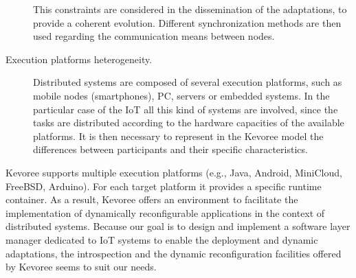 \begin{description}
	This constraints are considered in the dissemination of the adaptations, to provide a coherent evolution.
	Different synchronization methods are then used regarding the communication means between nodes.
	\item [Execution platforms heterogeneity.] Distributed systems are composed of several execution platforms, such as mobile nodes (smartphones), PC, servers or embedded systems. In the particular case of the IoT all this kind of systems are involved, since the tasks are distributed according to the hardware capacities of the available platforms.
	It is then necessary to represent in the Kevoree model the differences between participants and their specific characteristics.
\end{description}

Kevoree supports multiple execution platforms (e.g., Java, Android, MiniCloud, FreeBSD, Arduino).
For each target platform it provides a specific runtime container.
As a result, Kevoree offers an environment to facilitate the implementation of dynamically reconfigurable applications in the context of distributed systems. Because our goal is to design and implement a software layer manager dedicated to IoT systems to enable the deployment and dynamic adaptations, the introspection and the dynamic reconfiguration facilities offered by Kevoree seems to suit our needs.

